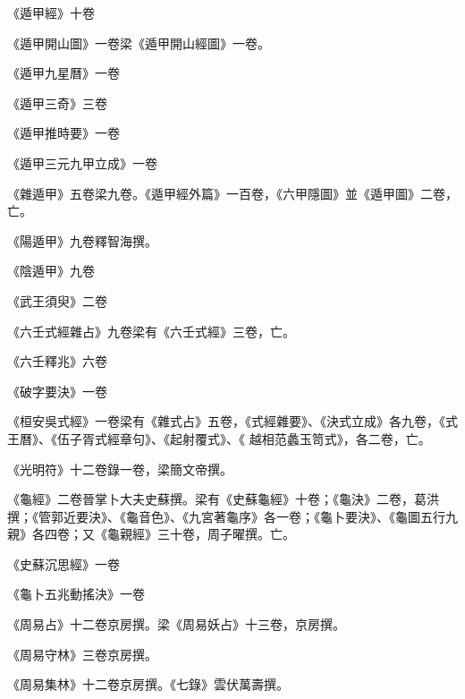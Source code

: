 \begin{pinyinscope}
 《遁甲經》十卷



 《遁甲開山圖》一卷梁《遁甲開山經圖》一卷。



 《遁甲九星曆》一卷



 《遁甲三奇》三卷



 《遁甲推時要》一卷



 《遁甲三元九甲立成》一卷



 《雜遁甲》五卷梁九卷。《遁甲經外篇》一百卷，《六甲隱圖》並《遁甲圖》二卷，亡。



 《陽遁甲》九卷釋智海撰。



 《陰遁甲》九卷



 《武王須臾》二卷



 《六壬式經雜占》九卷梁有《六壬式經》三卷，亡。



 《六壬釋兆》六卷



 《破字要決》一卷



 《桓安吳式經》一卷梁有《雜式占》五卷，《式經雜要》、《決式立成》各九卷，《式王曆》、《伍子胥式經章句》、《起射覆式》、《
 越相范蠡玉笥式》，各二卷，亡。



 《光明符》十二卷錄一卷，梁簡文帝撰。



 《龜經》二卷晉掌卜大夫史蘇撰。梁有《史蘇龜經》十卷；《龜決》二卷，葛洪撰；《管郭近要決》、《龜音色》、《九宮著龜序》各一卷；《龜卜要決》、《龜圖五行九親》各四卷；又《龜親經》三十卷，周子曜撰。亡。



 《史蘇沉思經》一卷



 《龜卜五兆動搖決》一卷



 《周易占》十二卷京房撰。梁《周易妖占》十三卷，京房撰。



 《周易守林》三卷京房撰。



 《周易集林》十二卷京房撰。《七錄》雲伏萬壽撰。




\end{pinyinscope}

